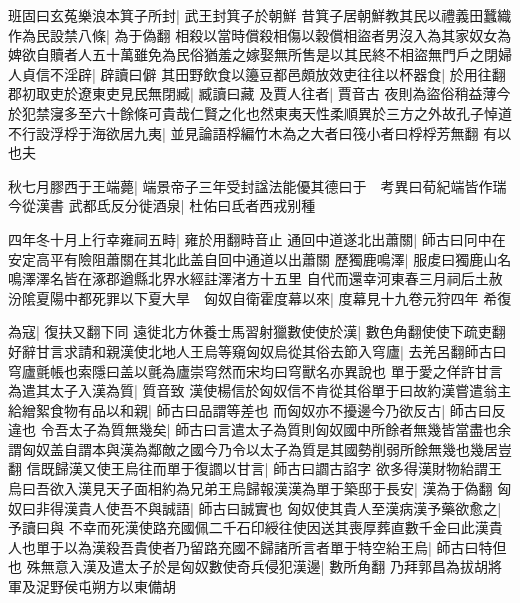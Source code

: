 班固曰玄菟樂浪本箕子所封|{
	武王封箕子於朝鮮}
昔箕子居朝鮮教其民以禮義田蠶織作為民設禁八條|{
	為于偽翻}
相殺以當時償殺相傷以穀償相盜者男沒入為其家奴女為婢欲自贖者人五十萬雖免為民俗猶羞之嫁娶無所售是以其民終不相盜無門戶之閉婦人貞信不淫辟|{
	辟讀曰僻}
其田野飲食以籩豆都邑頗放效吏往往以杯器食|{
	於用往翻}
郡初取吏於遼東吏見民無閉臧|{
	臧讀曰藏}
及賈人往者|{
	賈音古}
夜則為盜俗稍益薄今於犯禁寖多至六十餘條可貴哉仁賢之化也然東夷天性柔順異於三方之外故孔子悼道不行設浮桴于海欲居九夷|{
	並見論語桴編竹木為之大者曰筏小者曰桴桴芳無翻}
有以也夫

秋七月膠西于王端薨|{
	端景帝子三年受封諡法能優其德曰于　考異曰荀紀端皆作瑞今從漢書}
武都氐反分徙酒泉|{
	杜佑曰氐者西戎别種}


四年冬十月上行幸雍祠五畤|{
	雍於用翻畤音止}
通回中道遂北出蕭關|{
	師古曰冋中在安定高平有險阻蕭關在其北此盖自回中通道以出蕭關}
歷獨鹿鳴澤|{
	服䖍曰獨鹿山名鳴澤澤名皆在涿郡遒縣北界水經註澤渚方十五里}
自代而還幸河東春三月祠后土赦汾隂夏陽中都死罪以下夏大旱　匈奴自衛霍度幕以來|{
	度幕見十九卷元狩四年}
希復

為寇|{
	復扶又翻下同}
遠徙北方休養士馬習射獵數使使於漢|{
	數色角翻使使下疏吏翻}
好辭甘言求請和親漢使北地人王烏等窺匈奴烏從其俗去節入穹廬|{
	去羌呂翻師古曰穹廬氈帳也索隱曰盖以氈為廬崇穹然而宋均曰穹獸名亦異說也}
單于愛之佯許甘言為遣其太子入漢為質|{
	質音致}
漢使楊信於匈奴信不肯從其俗單于曰故約漢嘗遣翁主給繒絮食物有品以和親|{
	師古曰品謂等差也}
而匈奴亦不擾邊今乃欲反古|{
	師古曰反違也}
令吾太子為質無幾矣|{
	師古曰言遣太子為質則匈奴國中所餘者無幾皆當盡也余謂匈奴盖自謂本與漢為鄰敵之國今乃令以太子為質是其國勢削弱所餘無幾也幾居豈翻}
信既歸漢又使王烏往而單于復讇以甘言|{
	師古曰讇古諂字}
欲多得漢財物紿謂王烏曰吾欲入漢見天子面相約為兄弟王烏歸報漢漢為單于築邸于長安|{
	漢為于偽翻}
匈奴曰非得漢貴人使吾不與誠語|{
	師古曰誠實也}
匈奴使其貴人至漢病漢予藥欲愈之|{
	予讀曰與}
不幸而死漢使路充國佩二千石印綬往使因送其喪厚葬直數千金曰此漢貴人也單于以為漢殺吾貴使者乃留路充國不歸諸所言者單于特空紿王烏|{
	師古曰特但也}
殊無意入漢及遣太子於是匈奴數使奇兵侵犯漢邊|{
	數所角翻}
乃拜郭昌為拔胡將軍及浞野侯屯朔方以東備胡

